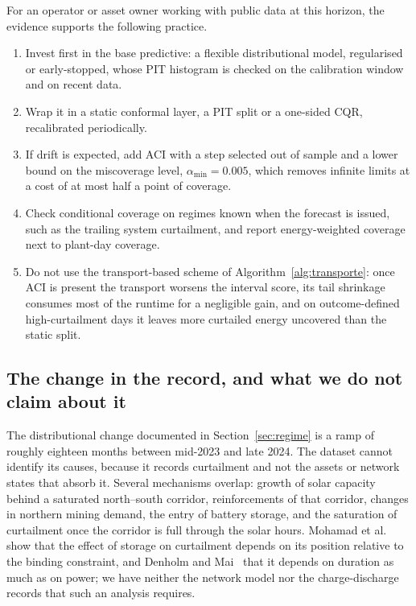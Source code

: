 For an operator or asset owner working with public data at this horizon, the evidence supports the following practice.
\begin{enumerate}
\item Invest first in the base predictive: a flexible distributional model, regularised or early-stopped, whose PIT histogram is checked on the calibration window and on recent data.
\item Wrap it in a static conformal layer, a PIT split or a one-sided CQR, recalibrated periodically.
\item If drift is expected, add ACI with a step selected out of sample and a lower bound on the miscoverage level, $\alpha_{\min}=0.005$, which removes infinite limits at a cost of at most half a point of coverage.
\item Check conditional coverage on regimes known when the forecast is issued, such as the trailing system curtailment, and report energy-weighted coverage next to plant-day coverage.
\item Do not use the transport-based scheme of Algorithm~\ref{alg:transporte}: once ACI is present the transport worsens the interval score, its tail shrinkage consumes most of the runtime for a negligible gain, and on outcome-defined high-curtailment days it leaves more curtailed energy uncovered than the static split.
\end{enumerate}

\subsection{The change in the record, and what we do not claim about it}
\label{sec:causas}

The distributional change documented in Section~\ref{sec:regime} is a ramp of roughly eighteen months between mid-2023 and late 2024. The dataset cannot identify its causes, because it records curtailment and not the assets or network states that absorb it. Several mechanisms overlap: growth of solar capacity behind a saturated north--south corridor, reinforcements of that corridor, changes in northern mining demand, the entry of battery storage, and the saturation of curtailment once the corridor is full through the solar hours. Mohamad et al.~\cite{mohamad2021} show that the effect of storage on curtailment depends on its position relative to the binding constraint, and Denholm and Mai~\cite{denholm2019} that it depends on duration as much as on power; we have neither the network model nor the charge-discharge records that such an analysis requires.

